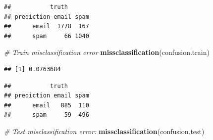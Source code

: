 \documentclass[]{book}
\newenvironment{Shaded}{\begin{snugshade}}{\end{snugshade}}
\newcommand{\CommentTok}[1]{\textcolor[rgb]{0.56,0.35,0.01}{\textit{#1}}}
\newcommand{\DataTypeTok}[1]{\textcolor[rgb]{0.13,0.29,0.53}{#1}}
\newcommand{\DecValTok}[1]{\textcolor[rgb]{0.00,0.00,0.81}{#1}}
\newcommand{\FloatTok}[1]{\textcolor[rgb]{0.00,0.00,0.81}{#1}}
\newcommand{\KeywordTok}[1]{\textcolor[rgb]{0.13,0.29,0.53}{\textbf{#1}}}
\newcommand{\NormalTok}[1]{#1}
\newcommand{\OperatorTok}[1]{\textcolor[rgb]{0.81,0.36,0.00}{\textbf{#1}}}
\newcommand{\StringTok}[1]{\textcolor[rgb]{0.31,0.60,0.02}{#1}}
\theoremstyle{definition}
\theoremstyle{definition}
\theoremstyle{definition}
\theoremstyle{remark}
\begin{document}
\begin{verbatim}
##           truth
## prediction email spam
##      email  1778  167
##      spam     66 1040
\end{verbatim}

\begin{Shaded}
\begin{Highlighting}[]
\CommentTok{# Train misclassification error}
\KeywordTok{missclassification}\NormalTok{(confusion.train)}
\end{Highlighting}
\end{Shaded}

\begin{verbatim}
## [1] 0.0763684
\end{verbatim}

\begin{Shaded}
\end{Shaded}

\begin{verbatim}
##           truth
## prediction email spam
##      email   885  110
##      spam     59  496
\end{verbatim}

\begin{Shaded}
\begin{Highlighting}[]
\CommentTok{# Test misclassification error:}
\KeywordTok{missclassification}\NormalTok{(confusion.test)}
\end{Highlighting}
\end{Shaded}
\end{document}
